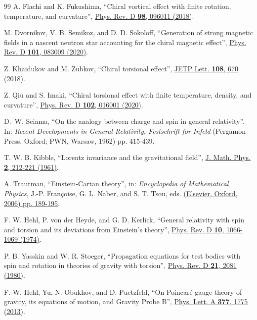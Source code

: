 \documentclass[12pt,prd,showkeys,amsmath,amssymb,nofootinbib]{revtex4-1}
\begin{document}
\begin{thebibliography}{99}
A. Flachi and K. Fukushima, ``Chiral vortical effect with finite rotation, temperature, and curvature'',
\href{https://doi.org/10.1103/PhysRevD.98.096011}{Phys. Rev. D {\bf 98}, 096011 (2018)}.

M. Dvornikov, V. B. Semikoz, and D. D. Sokoloff, ``Generation of strong magnetic fields in a
nascent neutron star accounting for the chiral magnetic effect'',
\href{https://doi.org/10.1103/PhysRevD.101.083009}{Phys. Rev. D {\bf 101}, 083009 (2020)}.

Z. Khaidukov and M. Zubkov, ``Chiral torsional effect'',
\href{https://doi.org/10.1134/S0021364018220046}{JETP Lett. {\bf 108}, 670 (2018)}.

Z. Qiu and S. Imaki, ``Chiral torsional effect with finite temperature, density, and curvature'',
\href{https://doi.org/10.1103/PhysRevD.102.016001}{Phys. Rev. D {\bf 102}, 016001 (2020)}.

D.~W. Sciama, ``On the analogy between charge and spin in general relativity''. In:
{\it Recent Developments in General Relativity, Festschrift for Infeld}
(Pergamon Press, Oxford; PWN, Warsaw, 1962) pp. 415-439.

T. W. B. Kibble, ``Lorentz invariance and the gravitational field'',
\href{https://doi.org/10.1063/1.1703702}{J. Math. Phys. {\bf 2}, 212-221 (1961)}. 

A. Trautman, ``Einstein-Cartan theory'', in: {\it Encyclopedia of
Mathematical Physics}, J.-P. Fran\c{c}oise, G. L. Naber, and S. T. Tsou, eds.
\href{https://arxiv.org/abs/gr-qc/0606062}{(Elsevier, Oxford, 2006) pp. 189-195}. 

F. W. Hehl, P. von der Heyde, and G. D. Kerlick, ``General relativity with spin and torsion
and its deviations from Einstein's theory'',
\href{https://doi.org/10.1103/PhysRevD.10.1066}{Phys. Rev. D {\bf 10}, 1066-1069 (1974)}.

P. B. Yasskin and W. R. Stoeger, ``Propagation equations
for test bodies with spin and rotation in theories of gravity with torsion'',
\href{https://doi.org/10.1103/PhysRevD.21.2081}{Phys. Rev. D {\bf 21}, 2081 (1980)}. 

F. W. Hehl, Yu. N. Obukhov, and D. Puetzfeld,
``On Poincar\'e gauge theory of gravity, its equations of motion, and Gravity Probe B'',
\href{https://doi.org/https://doi.org/10.1016/j.physleta.2013.04.055}{Phys. Lett. A {\bf 377}, 1775 (2013)}.
  

\end{thebibliography}
\end{document}
